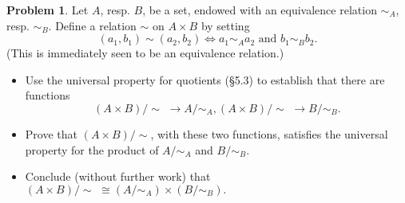\documentclass[fontsize=14pt]{scrartcl}
\theoremstyle{definition}
\newtheorem{problem-internal}{Problem}[subsection]
\newenvironment{problem}{
  \medskip
  \begin{problem-internal}
}{
  \end{problem-internal}
}
\begin{document}
\begin{problem}
\newcommand{\quot}[2]{#1/\!\!#2\,\,}
\newcommand{\quotntws}[2]{#1/\!\!#2}
Let $A$, resp. $B$, be a set, endowed with an equivalence relation $\sim_A$,
resp. $\sim_B$.
Define a relation $\sim$ on $A\times B$ by setting
\[ (a_1, b_1) \sim (a_2, b_2) \iff a_1 \sim_A a_2 \text{ and } b_1 \sim_B b_2. \]
(This is immediately seen to be an equivalence relation.)
\begin{itemize}
\item Use the universal property for quotients (\S5.3) to establish that there are
functions
\[ \quot{(A\times B)}{\sim} \to \quotntws{A}{\sim_A},
   \quot{(A\times B)}{\sim} \to \quotntws{B}{\sim_B}. \]
\item Prove that $\quotntws{(A\times B)}{\sim}$, with these two functions,
satisfies the universal property for the product of $\quotntws{A}{\sim_A}$ and
$\quotntws{B}{\sim_B}$.
\item Conclude (without further work) that $\quot{(A\times
B)}{\sim}\cong(\quotntws{A}{\sim_A})\times(\quotntws{B}{\sim_B}).$
\end{itemize}
\end{problem}
\end{document}
